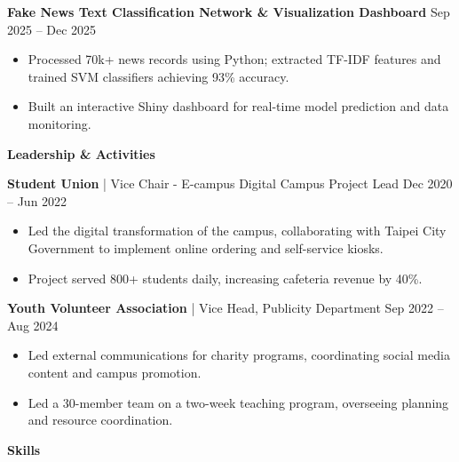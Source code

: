 \documentclass[11pt]{article}
\begin{document}
\vspace{2pt}
\textbf{Fake News Text Classification Network \& Visualization Dashboard} \hfill Sep 2025 -- Dec 2025  
\begin{itemize}[itemsep=0pt, parsep=0pt, topsep=1pt, partopsep=0pt, leftmargin=15pt]
    \item Processed 70k+ news records using Python; extracted TF-IDF features and trained SVM classifiers achieving 93\% accuracy.
    \item Built an interactive Shiny dashboard for real-time model prediction and data monitoring.
\end{itemize}

\vspace{-5pt}
\begin{center}
    \textbf{Leadership \& Activities} \\
    \vspace{-5pt}
    \hrulefill
\end{center}
\vspace{-5pt}

\textbf{Student Union} | Vice Chair - E-campus Digital Campus Project Lead \hfill Dec 2020 -- Jun 2022  
\begin{itemize}[itemsep=0pt, parsep=0pt, topsep=1pt, partopsep=0pt, leftmargin=15pt]
    \item Led the digital transformation of the campus, collaborating with Taipei City Government to implement online ordering and self-service kiosks.
    \item Project served 800+ students daily, increasing cafeteria revenue by 40\%.
\end{itemize}

\vspace{2pt}
\textbf{Youth Volunteer Association} | Vice Head, Publicity Department \hfill Sep 2022 -- Aug 2024  
\begin{itemize}[itemsep=0pt, parsep=0pt, topsep=1pt, partopsep=0pt, leftmargin=15pt]
    \item Led external communications for charity programs, coordinating social media content and campus promotion.
    \item Led a 30-member team on a two-week teaching program, overseeing planning and resource coordination.
\end{itemize}

\vspace{-5pt}
\begin{center}
    \textbf{Skills} \\
    \vspace{-5pt}
    \hrulefill
\end{center}
\vspace{-3pt}
\end{document}
